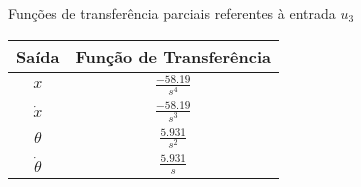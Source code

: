 \begin{quadro}[!htb]
    \centering
    \caption{Funções de transferência parciais referentes à entrada $u_3$\label{qua:resultados_quadro_tfs_u3}}
    \begin{tabular}{|c|c|}
        \hline
        \textbf{Saída} & 
        \textbf{Função de Transferência} \\
        \hline
            $x$ &
            $\frac{-58.19}{s^4}$ \\[1ex]
        \hline
            $\dot{x}$ &
            $\frac{-58.19}{s^3}$ \\[1ex]
        \hline
            $\theta$ &
            $\frac{5.931}{s^2}$ \\[1ex]
        \hline
            $\dot{\theta}$ &
            $\frac{5.931}{s}$ \\[1ex]
        \hline
    \end{tabular}
\end{quadro}
